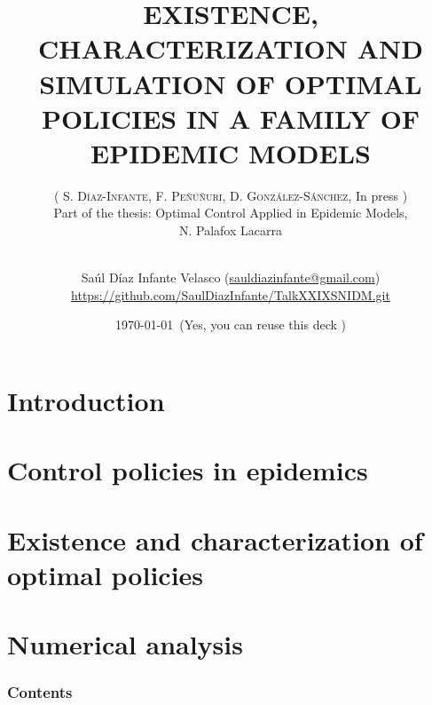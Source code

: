 \documentclass[xcolor={x11names,svgnames,dvipsnames},trans]{beamer}
\author[Sa\'ul D\'iaz Infante Velasco]{
    \texorpdfstring{
        Sa\'ul D\'iaz Infante Velasco
        (\url{sauldiazinfante@gmail.com})
        \\
        \url{https://github.com/SaulDiazInfante/TalkXXIXSNIDM.git}}
        {Sa\'ul D\'iaz Infante Velasco}
    }
\title{
    EXISTENCE, CHARACTERIZATION AND SIMULATION OF OPTIMAL
    POLICIES IN A FAMILY OF EPIDEMIC MODELS}
\subtitle{
    \texorpdfstring{
        (%
            \textsc{
                S. D\'iaz-Infante,
                F. Pe\~n\'u\~nuri,
                D. Gonz\'alez-S\'anchez}, In press%
        )\\%
    Part of the thesis:
    Optimal Control Applied in Epidemic Models,
    \\
    N. Palafox Lacarra
    \\
    \hrulefill\
    \adforn{57}
    \thickspace\wb{m}
    \thickspace\adforn{29}\
    \hrulefill
    }{}
}
\date[\ccbyncsa]{\today \ (Yes, you can reuse this deck \Smiley)}
\begin{document}
    \begin{frame}[plain]
        \maketitle
    \end{frame}
    \section{Introduction}
        
    \section{Control policies in epidemics}
        
    \section{Existence and characterization of optimal policies}
    \section{Numerical analysis}

    \begin{frame}
        \frametitle{Contents}
        \tableofcontents
    \end{frame}
\end{document}
